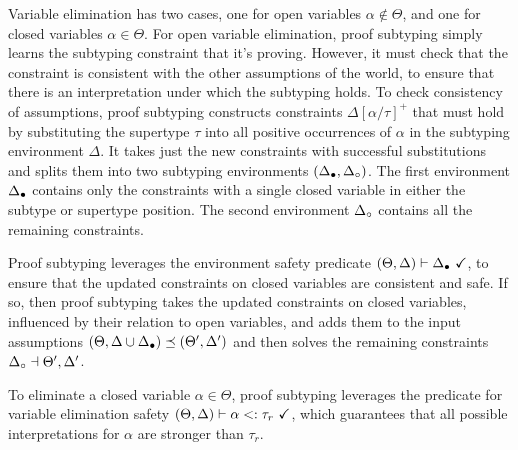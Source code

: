 \documentclass[acmsmall]{acmart}
\theoremstyle{definition}
\begin{document}
\noindent
Variable elimination has two cases, 
one for open variables $\alpha \not\in \Theta$,
and one for closed variables $\alpha \in \Theta$.
For open variable elimination, proof subtyping simply learns
the subtyping constraint that it's proving.
However, it must check that the constraint is consistent
with the other assumptions of the world,
to ensure that there is an interpretation under which the subtyping holds. 
To check consistency of assumptions,  
proof subtyping constructs constraints $\Delta[\alpha/\tau]^+$ that must hold by 
substituting the supertype $\tau$ into all positive occurrences
of $\alpha$ in the subtyping environment $\Delta$.
It takes just the new constraints with successful substitutions
and splits them into two subtyping environments $(\Delta_\bullet, \Delta_\circ)$. 
The first environment $\Delta_\bullet$ contains only the constraints with a single
closed variable in either the subtype or supertype position. The second
environment $\Delta_\circ$ contains all the remaining constraints.

Proof subtyping leverages the environment safety predicate 
$(\Theta, \Delta) \vdash \Delta_\bullet \ \checkmark$, 
to ensure that the updated constraints on closed variables are consistent and safe.
If so, then proof subtyping takes the updated constraints on closed variables, influenced by their relation
to open variables, and adds them to the input assumptions 
$(\Theta, \Delta \cup \Delta_\bullet) \preceq (\Theta', \Delta')$ 
and then solves the remaining constraints $\Delta_\circ \dashv \Theta', \Delta'$. 

To eliminate a closed variable $\alpha \in \Theta$,
proof subtyping leverages the predicate for variable elimination safety
$(\Theta, \Delta) \vdash \alpha <: \tau_r \ \checkmark$,
which guarantees that all possible interpretations for $\alpha$
are stronger than $\tau_r$.
\end{document}
